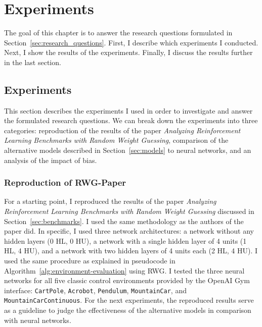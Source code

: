 
\chapter{Experiments}
\label{ch:experiments}
The goal of this chapter is to answer the research questions formulated in Section~\ref{sec:research_questions}. First, I describe which experiments I conducted. Next, I show the results of the experiments. Finally, I discuss the results further in the last section.

\section{Experiments}
This section describes the experiments I used in order to investigate and answer the formulated research questions. We can break down the experiments into three categories: reproduction of the results of the paper \emph{Analyzing Reinforcement Learning Benchmarks with Random Weight Guessing}, comparison of the alternative models described in Section~\ref{sec:models} to neural networks, and an analysis of the impact of bias.

\subsection{Reproduction of RWG-Paper}
For a starting point, I reproduced the results of the paper \emph{Analyzing Reinforcement Learning Benchmarks with Random Weight Guessing} discussed in Section~\ref{sec:benchmarks}. I used the same methodology as the authors of the paper did. In specific, I used three network architectures: a network without any hidden layers (0 HL, 0 HU), a network with a single hidden layer of 4 units (1 HL, 4 HU), and a network with two hidden layers of 4 units each (2 HL, 4 HU). I used the same procedure as explained in pseudocode in Algorithm~\ref{alg:environment-evaluation} using RWG. I tested the three neural networks for all five classic control environments provided by the OpenAI Gym interface: \verb|CartPole|, \verb|Acrobot|, \verb|Pendulum|, \verb|MountainCar|, and \verb|MountainCarContinuous|. For the next experiments, the reproduced results serve as a guideline to judge the effectiveness of the alternative models in comparison with neural networks.

